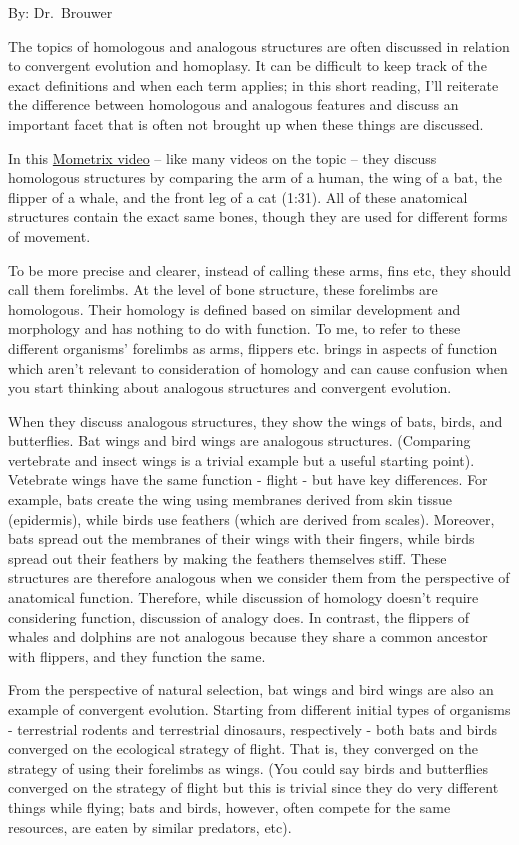 \documentclass[
]{book}
\begin{document}
By: Dr.~Brouwer

The topics of homologous and analogous structures are often discussed in relation to convergent evolution and homoplasy. It can be difficult to keep track of the exact definitions and when each term applies; in this short reading, I'll reiterate the difference between homologous and analogous features and discuss an important facet that is often not brought up when these things are discussed.

In this \href{https://www.youtube.com/watch?v=xQmb6B8c_TI}{Mometrix video} -- like many videos on the topic -- they discuss homologous structures by comparing the arm of a human, the wing of a bat, the flipper of a whale, and the front leg of a cat (1:31). All of these anatomical structures contain the exact same bones, though they are used for different forms of movement.

To be more precise and clearer, instead of calling these arms, fins etc, they should call them forelimbs. At the level of bone structure, these forelimbs are homologous. Their homology is defined based on similar development and morphology and has nothing to do with function. To me, to refer to these different organisms' forelimbs as arms, flippers etc. brings in aspects of function which aren't relevant to consideration of homology and can cause confusion when you start thinking about analogous structures and convergent evolution.

When they discuss analogous structures, they show the wings of bats, birds, and butterflies. Bat wings and bird wings are analogous structures. (Comparing vertebrate and insect wings is a trivial example but a useful starting point). Vetebrate wings have the same function - flight - but have key differences. For example, bats create the wing using membranes derived from skin tissue (epidermis), while birds use feathers (which are derived from scales). Moreover, bats spread out the membranes of their wings with their fingers, while birds spread out their feathers by making the feathers themselves stiff. These structures are therefore analogous when we consider them from the perspective of anatomical function. Therefore, while discussion of homology doesn't require considering function, discussion of analogy does. In contrast, the flippers of whales and dolphins are not analogous because they share a common ancestor with flippers, and they function the same.

From the perspective of natural selection, bat wings and bird wings are also an example of convergent evolution. Starting from different initial types of organisms - terrestrial rodents and terrestrial dinosaurs, respectively - both bats and birds converged on the ecological strategy of flight. That is, they converged on the strategy of using their forelimbs as wings. (You could say birds and butterflies converged on the strategy of flight but this is trivial since they do very different things while flying; bats and birds, however, often compete for the same resources, are eaten by similar predators, etc).
\end{document}

